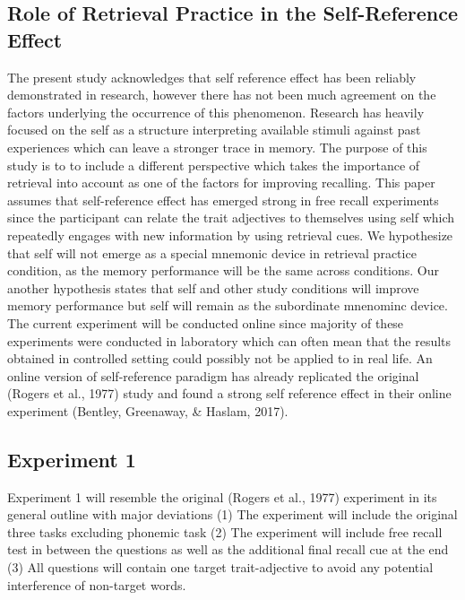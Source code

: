 \documentclass[
  man,floatsintext]{apa6}
\begin{document}
\hypertarget{role-of-retrieval-practice-in-the-self-reference-effect}{%
\subsection{Role of Retrieval Practice in the Self-Reference Effect}\label{role-of-retrieval-practice-in-the-self-reference-effect}}

The present study acknowledges that self reference effect has been reliably demonstrated in research, however there has not been much agreement on the factors underlying the occurrence of this phenomenon. Research has heavily focused on the self as a structure interpreting available stimuli against past experiences which can leave a stronger trace in memory. The purpose of this study is to to include a different perspective which takes the importance of retrieval into account as one of the factors for improving recalling. This paper assumes that self-reference effect has emerged strong in free recall experiments since the participant can relate the trait adjectives to themselves using self which repeatedly engages with new information by using retrieval cues. We hypothesize that self will not emerge as a special mnemonic device in retrieval practice condition, as the memory performance will be the same across conditions. Our another hypothesis states that self and other study conditions will improve memory performance but self will remain as the subordinate mnenominc device. The current experiment will be conducted online since majority of these experiments were conducted in laboratory which can often mean that the results obtained in controlled setting could possibly not be applied to in real life. An online version of self-reference paradigm has already replicated the original (Rogers et al., 1977) study and found a strong self reference effect in their online experiment (Bentley, Greenaway, \& Haslam, 2017).

\hypertarget{experiment-1}{%
\subsection{Experiment 1}\label{experiment-1}}

Experiment 1 will resemble the original (Rogers et al., 1977) experiment in its general outline with major deviations (1) The experiment will include the original three tasks excluding phonemic task (2) The experiment will include free recall test in between the questions as well as the additional final recall cue at the end (3) All questions will contain one target trait-adjective to avoid any potential interference of non-target words.
\end{document}
